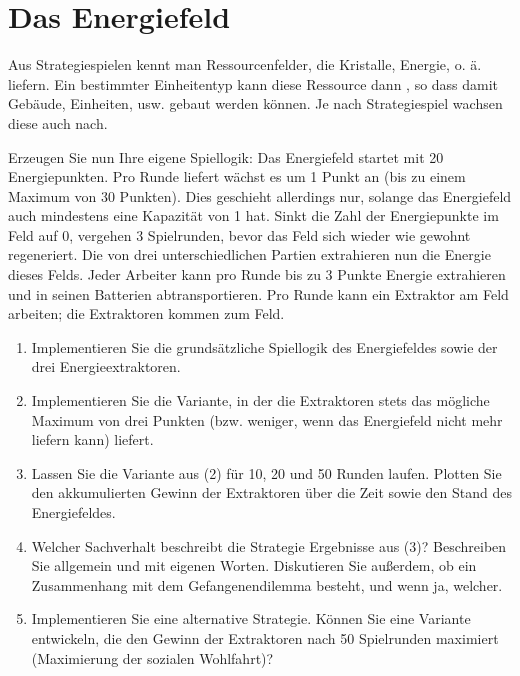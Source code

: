 \chapter{Das Energiefeld}
\label{ch:02_energy-field}

\begin{universityTask}
    Aus Strategiespielen kennt man Ressourcenfelder, die Kristalle, Energie, o. ä. liefern. Ein bestimmter Einheitentyp kann diese Ressource dann , so dass damit Gebäude, Einheiten, usw. gebaut werden können. Je nach Strategiespiel wachsen diese auch nach.

    Erzeugen Sie nun Ihre eigene Spiellogik:  
    Das Energiefeld startet mit 20 Energiepunkten. Pro Runde liefert wächst es um 1 Punkt an (bis zu einem Maximum von 30 Punkten). Dies geschieht allerdings nur, solange das Energiefeld auch mindestens eine Kapazität von 1 hat. Sinkt die Zahl der Energiepunkte im Feld auf 0, vergehen 3 Spielrunden, bevor das Feld sich wieder wie gewohnt regeneriert.  
    Die  von drei unterschiedlichen Partien extrahieren nun die Energie dieses Felds. Jeder Arbeiter kann pro Runde bis zu 3 Punkte Energie extrahieren und in seinen Batterien abtransportieren. Pro Runde kann ein Extraktor am Feld arbeiten; die Extraktoren kommen  zum Feld.

    \begin{enumerate}[label=(\arabic*)]
        \item Implementieren Sie die grundsätzliche Spiellogik des Energiefeldes sowie der drei Energieextraktoren.
        \item Implementieren Sie die Variante, in der die Extraktoren stets das mögliche Maximum von drei Punkten (bzw. weniger, wenn das Energiefeld nicht mehr liefern kann) liefert.
        \item Lassen Sie die Variante aus (2) für 10, 20 und 50 Runden laufen. Plotten Sie den akkumulierten Gewinn der Extraktoren über die Zeit sowie den Stand des Energiefeldes.
        \item Welcher Sachverhalt beschreibt die Strategie Ergebnisse aus (3)? Beschreiben Sie allgemein und mit eigenen Worten. Diskutieren Sie außerdem, ob ein Zusammenhang mit dem Gefangenendilemma besteht, und wenn ja, welcher.
        \item Implementieren Sie eine alternative Strategie. Können Sie eine Variante entwickeln, die den Gewinn der Extraktoren nach 50 Spielrunden maximiert (Maximierung der sozialen Wohlfahrt)?
    \end{enumerate}
    
\end{universityTask}

